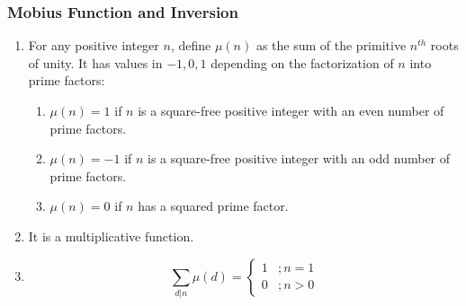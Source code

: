 \subsubsection{Mobius Function and Inversion}\begin{enumerate}

            
            \item For any positive integer $n$, define $\displaystyle \mu(n)$ as the sum of the primitive $n^{th}$ roots
                of
                unity.
                It has values in $\displaystyle {-1, 0, 1}$ depending on the factorization of $n$ into prime factors:
                \begin{enumerate}

                    \item $\displaystyle \mu(n)=1$ if $n$ is a square-free positive integer with an even number of prime
                        factors.
                    
                    \item $\displaystyle \mu(n)=-1$ if $n$ is a square-free positive integer with an odd number of prime
                        factors.
                    
                    \item $\displaystyle \mu(n)=0$ if $n$ has a squared prime factor.
                \end{enumerate}

            
            \item It is a multiplicative function.
            \item 
                \[\sum_{d|n}\mu(d) =
                \begin{cases}
                1 & ; n=1\\
                0 & ; n > 0
                \end{cases}\]
            

\end{enumerate}
